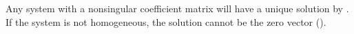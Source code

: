 Any system with a nonsingular coefficient matrix will have a unique solution by .  If the system is not homogeneous, the solution cannot be the zero vector ().
